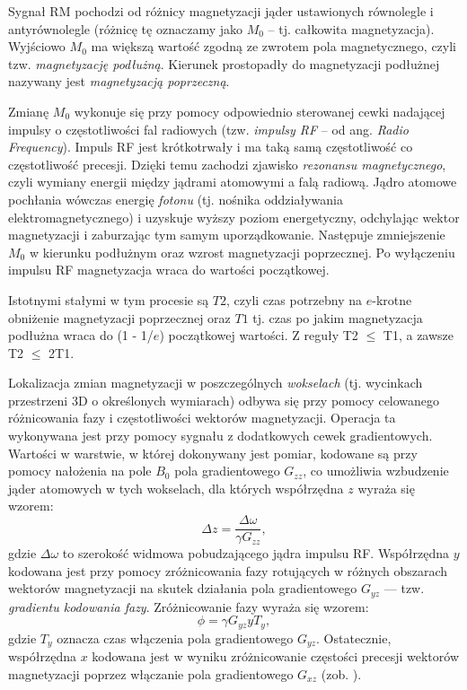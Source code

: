 Sygnał RM pochodzi od różnicy magnetyzacji jąder ustawionych równolegle \linebreak i antyrównolegle (różnicę tę oznaczamy jako $M_0$ -- tj. całkowita magnetyzacja). Wyjściowo $M_0$ ma większą wartość zgodną ze zwrotem pola magnetycznego, czyli tzw. \textit{magnetyzację podłużną}. Kierunek prostopadły do magnetyzacji podłużnej nazywany jest \textit{magnetyzacją poprzeczną}.

Zmianę $M_0$ wykonuje się przy pomocy odpowiednio sterowanej cewki nadającej impulsy o częstotliwości fal radiowych (tzw. \textit{impulsy RF} -- od ang. \textit{Radio Frequency}). Impuls RF jest krótkotrwały i ma taką samą częstotliwość co częstotliwość precesji. Dzięki temu zachodzi zjawisko \textit{rezonansu magnetycznego}, czyli wymiany energii między jądrami atomowymi a falą radiową. Jądro atomowe pochłania wówczas energię \textit{fotonu} (tj. nośnika oddziaływania elektromagnetycznego) i uzyskuje wyższy poziom energetyczny, odchylając wektor magnetyzacji i zaburzając tym samym uporządkowanie. Następuje zmniejszenie $M_0$ w kierunku podłużnym oraz wzrost magnetyzacji poprzecznej. Po wyłączeniu impulsu RF magnetyzacja wraca do wartości początkowej. 

Istotnymi stałymi w tym procesie są $T2$, czyli czas potrzebny na $e$-krotne obniżenie magnetyzacji poprzecznej oraz $T1$ tj. czas po jakim magnetyzacja podłużna wraca do (1 - 1/$e$) początkowej wartości. Z reguły T2 $\leq$ T1, a zawsze T2 $\leq$ 2T1.   

Lokalizacja zmian magnetyzacji w poszczególnych \textit{wokselach} (tj. wycinkach przestrzeni 3D o określonych wymiarach) odbywa się przy pomocy celowanego różnicowania fazy i częstotliwości wektorów magnetyzacji. Operacja ta wykonywana jest przy pomocy sygnału z dodatkowych cewek gradientowych. Wartości w warstwie, \linebreak w której dokonywany jest pomiar, kodowane są przy pomocy nałożenia na pole $B_0$ pola gradientowego $G_{zz}$, co umożliwia wzbudzenie jąder atomowych w tych wokselach, dla których współrzędna $z$ wyraża się wzorem:
\begin{equation}
\Delta z = \frac{\Delta \omega}{\gamma G_{zz}},
\end{equation}
gdzie $\Delta \omega$ to szerokość widmowa pobudzającego jądra impulsu RF. Współrzędna \linebreak $y$ kodowana jest przy pomocy zróżnicowania fazy rotujących w różnych obszarach wektorów magnetyzacji na skutek działania pola gradientowego $G_{yz}$ — tzw. \textit{gradientu kodowania fazy}. Zróżnicowanie fazy wyraża się wzorem:
\begin{equation}
\phi = \gamma G_{yz}yT_{y},
\end{equation}
gdzie $T_y$ oznacza czas włączenia pola gradientowego $G_{yz}$. Ostatecznie, współrzędna $x$ kodowana jest w wyniku zróżnicowanie częstości precesji wektorów magnetyzacji poprzez włączanie pola gradientowego $G_{xz}$ (zob. \cite{ObrazowanieMedyczne}). 

